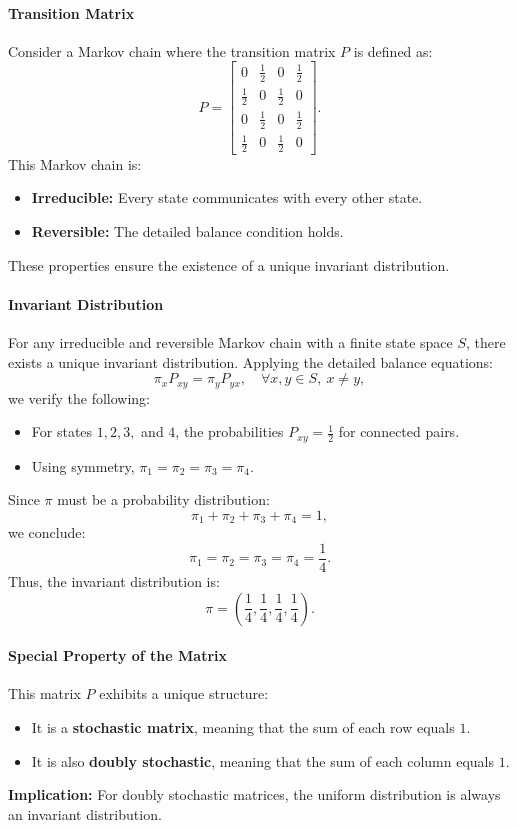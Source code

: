 \paragraph{Transition Matrix}
Consider a Markov chain where the transition matrix \( P \) is defined as:
\[
P =
\begin{bmatrix}
0 & \frac{1}{2} & 0 & \frac{1}{2} \\
\frac{1}{2} & 0 & \frac{1}{2} & 0 \\
0 & \frac{1}{2} & 0 & \frac{1}{2} \\
\frac{1}{2} & 0 & \frac{1}{2} & 0
\end{bmatrix}.
\]
This Markov chain is:
\begin{itemize}
    \item \textbf{Irreducible:} Every state communicates with every other state.
    \item \textbf{Reversible:} The detailed balance condition holds.
\end{itemize}
These properties ensure the existence of a unique invariant distribution.

\paragraph{Invariant Distribution}
For any irreducible and reversible Markov chain with a finite state space \( S \), there exists a unique invariant distribution. \newline
Applying the detailed balance equations:
\[
\pi_x P_{xy} = \pi_y P_{yx}, \quad \forall x, y \in S, \ x \neq y,
\]
we verify the following:
\begin{itemize}
    \item For states \( 1, 2, 3, \) and \( 4 \), the probabilities \( P_{xy} = \frac{1}{2} \) for connected pairs.
    \item Using symmetry, \( \pi_1 = \pi_2 = \pi_3 = \pi_4 \).
\end{itemize}
Since \( \pi \) must be a probability distribution:
\[
\pi_1 + \pi_2 + \pi_3 + \pi_4 = 1,
\]
we conclude:
\[
\pi_1 = \pi_2 = \pi_3 = \pi_4 = \frac{1}{4}.
\]
Thus, the invariant distribution is:
\[
\pi = \left( \frac{1}{4}, \frac{1}{4}, \frac{1}{4}, \frac{1}{4} \right).
\]
\paragraph{Special Property of the Matrix}
This matrix \( P \) exhibits a unique structure:
\begin{itemize}
    \item It is a \textbf{stochastic matrix}, meaning that the sum of each row equals \( 1 \).
    \item It is also \textbf{doubly stochastic}, meaning that the sum of each column equals \( 1 \).
\end{itemize}
\textbf{Implication:} For doubly stochastic matrices, the uniform distribution is always an invariant distribution.



